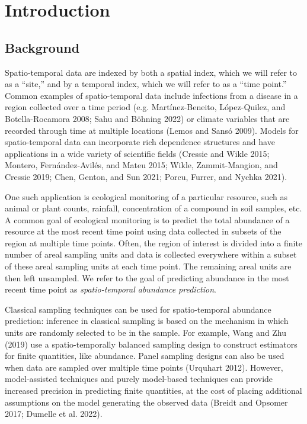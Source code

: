 \documentclass[smallextended]{svjour3}       %
\begin{document}
\hypertarget{intro}{%
\section{Introduction}\label{intro}}

\hypertarget{background}{%
\subsection{Background}\label{background}}

Spatio-temporal data are indexed by both a spatial index, which we will
refer to as a ``site,'' and by a temporal index, which we will refer to
as a ``time point.'' Common examples of spatio-temporal data include
infections from a disease in a region collected over a time period (e.g.
Martínez-Beneito, López-Quilez, and Botella-Rocamora 2008; Sahu and
Böhning 2022) or climate variables that are recorded through time at
multiple locations (Lemos and Sansó 2009). Models for spatio-temporal
data can incorporate rich dependence structures and have applications in
a wide variety of scientific fields (Cressie and Wikle 2015; Montero,
Fernández-Avilés, and Mateu 2015; Wikle, Zammit-Mangion, and Cressie
2019; Chen, Genton, and Sun 2021; Porcu, Furrer, and Nychka 2021).

One such application is ecological monitoring of a particular resource,
such as animal or plant counts, rainfall, concentration of a compound in
soil samples, etc. A common goal of ecological monitoring is to predict
the total abundance of a resource at the most recent time point using
data collected in subsets of the region at multiple time points. Often,
the region of interest is divided into a finite number of areal sampling
units and data is collected everywhere within a subset of these areal
sampling units at each time point. The remaining areal units are then
left unsampled. We refer to the goal of predicting abundance in the most
recent time point as \emph{spatio-temporal abundance prediction}.

Classical sampling techniques can be used for spatio-temporal abundance
prediction: inference in classical sampling is based on the mechanism in
which units are randomly selected to be in the sample. For example, Wang
and Zhu (2019) use a spatio-temporally balanced sampling design to
construct estimators for finite quantities, like abundance. Panel
sampling designs can also be used when data are sampled over multiple
time points (Urquhart 2012). However, model-assisted techniques and
purely model-based techniques can provide increased precision in
predicting finite quantities, at the cost of placing additional
assumptions on the model generating the observed data (Breidt and
Opsomer 2017; Dumelle et al. 2022).
\end{document}
